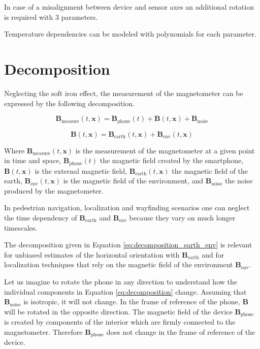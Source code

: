 In case of a misalignment between device and sensor axes an additional rotation is required with 3 parameters.

Temperature dependencies can be modeled with polynomials for each parameter.

\section{Decomposition}

Neglecting the soft iron effect, the measurement of the magnetometer can be expressed by the following decomposition.

\begin{equation}
\label{eq:decomposition}
    \bm{B}_\text{measure}(t, \bm{x}) = \bm{B}_\text{phone}(t) + \bm{B}(t, \bm{x}) + \bm{B}_\text{noise}
\end{equation}

\begin{equation}
\label{eq:decomposition_earth_env}
    \bm{B}(t, \bm{x}) = \bm{B}_\text{earth}(t, \bm{x}) + \bm{B}_\text{env}(t, \bm{x})
\end{equation}

Where $\bm{B}_\text{measure}(t, \bm{x})$ is the measurement of the magnetometer at a given point in time and space, $\bm{B}_\text{phone}(t)$ the magnetic field created by the smartphone, $\bm{B}(t, \bm{x})$ is the external magnetic field, $\bm{B}_\text{earth}(t, \bm{x})$ the magnetic field of the earth, $\bm{B}_\text{env}(t, \bm{x})$ is the magnetic field of the environment, and $\bm{B}_\text{noise}$ the noise produced by the magnetometer.

In pedestrian navigation, localization and wayfinding scenarios one can neglect the time dependency of $\bm{B}_\text{earth}$ and $\bm{B}_\text{env}$ because they vary on much longer timescales.

The decomposition given in Equation \ref{eq:decomposition_earth_env} is relevant for unbiased estimates of the horizontal orientation with $\bm{B}_\text{earth}$ and for localization techniques that rely on the magnetic field of the environment $\bm{B}_\text{env}$.

Let us imagine to rotate the phone in any direction to understand how the individual components in Equation \ref{eq:decomposition} change. Assuming that $\bm{B}_\text{noise}$ is isotropic, it will not change. In the frame of reference of the phone, $\bm{B}$ will be rotated in the opposite direction. The magnetic field of the device $\bm{B}_\text{phone}$ is created by components of the interior which are firmly connected to the magnetometer. Therefore $\bm{B}_\text{phone}$ does not change in the frame of reference of the device.

